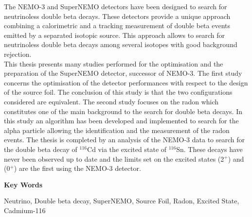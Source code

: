 \documentclass[main.tex]{subfiles}
\begin{document}
\begin{changemargin}{-2cm}{-1cm}
\begin{multicols}{2}
\noindent The NEMO-3 and SuperNEMO detectors have been designed to search for neutrinoless double beta decays. These detectors provide a unique approach combining a calorimetric and a tracking measurement of double beta events emitted by a separated isotopic source. This approach allows to search for neutrinoless double beta decays among several isotopes with good background rejection. \\
\noindent This thesis presents many studies performed for the optimisation and the preparation of the SuperNEMO detector, successor of NEMO-3. The first study concerns the optimisation of the detector performances with respect to the design of the source foil. The conclusion of this study is that the two configurations considered are equivalent. The second study focuses on the radon which constitutes one of the main background to the search for double beta decays. In this study an algorithm has been developed and implemented to search for the alpha particle allowing the identification and the measurement of the radon events. The thesis is completed by an analysis of the NEMO-3 data to search for the double beta decay of $^{\text{116}}$Cd via the excited state of $^{\text{116}}$Sn. These decays have never been observed up to date and the limits set on the excited states (2$^+$) and (0$^+$) are the first using the NEMO-3 detector.

\vspace{3.85cm}

\NI \textbf{Key Words}

\bigskip

\NI \small{Neutrino, Double beta decay, SuperNEMO, Source Foil, Radon, Excited State, Cadmium-116}


\end{multicols}

\end{changemargin}
\end{document}
